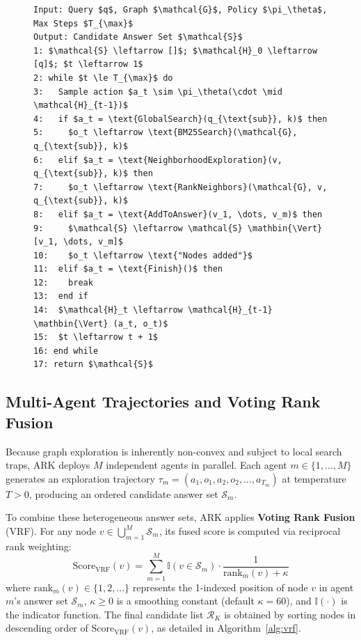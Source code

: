 \documentclass[11pt]{article}
\begin{document}
\begin{figure}[t]
\centering
\begin{lstlisting}[mathescape=true, caption={ARK Single-Agent Trajectory Rollout}, label={alg:ark_rollout}]
Input: Query $q$, Graph $\mathcal{G}$, Policy $\pi_\theta$, Max Steps $T_{\max}$
Output: Candidate Answer Set $\mathcal{S}$
1: $\mathcal{S} \leftarrow []$; $\mathcal{H}_0 \leftarrow [q]$; $t \leftarrow 1$
2: while $t \le T_{\max}$ do
3:   Sample action $a_t \sim \pi_\theta(\cdot \mid \mathcal{H}_{t-1})$
4:   if $a_t = \text{GlobalSearch}(q_{\text{sub}}, k)$ then
5:     $o_t \leftarrow \text{BM25Search}(\mathcal{G}, q_{\text{sub}}, k)$
6:   elif $a_t = \text{NeighborhoodExploration}(v, q_{\text{sub}}, k)$ then
7:     $o_t \leftarrow \text{RankNeighbors}(\mathcal{G}, v, q_{\text{sub}}, k)$
8:   elif $a_t = \text{AddToAnswer}(v_1, \dots, v_m)$ then
9:     $\mathcal{S} \leftarrow \mathcal{S} \mathbin{\Vert} [v_1, \dots, v_m]$
10:    $o_t \leftarrow \text{"Nodes added"}$
11:  elif $a_t = \text{Finish}()$ then
12:    break
13:  end if
14:  $\mathcal{H}_t \leftarrow \mathcal{H}_{t-1} \mathbin{\Vert} (a_t, o_t)$
15:  $t \leftarrow t + 1$
16: end while
17: return $\mathcal{S}$
\end{lstlisting}
\end{figure}

\subsection{Multi-Agent Trajectories and Voting Rank Fusion}
Because graph exploration is inherently non-convex and subject to local search traps, ARK deploys $M$ independent agents in parallel. Each agent $m \in \{1, \dots, M\}$ generates an exploration trajectory $\tau_m = (a_1, o_1, a_2, o_2, \dots, a_{T_m})$ at temperature $T > 0$, producing an ordered candidate answer set $\mathcal{S}_m$.

To combine these heterogeneous answer sets, ARK applies \textbf{Voting Rank Fusion} (VRF). For any node $v \in \bigcup_{m=1}^M \mathcal{S}_m$, its fused score is computed via reciprocal rank weighting:
\begin{equation}
\label{eq:vrf}
\text{Score}_{\text{VRF}}(v) = \sum_{m=1}^M \mathbb{I}(v \in \mathcal{S}_m) \cdot \frac{1}{\text{rank}_m(v) + \kappa}
\end{equation}
where $\text{rank}_m(v) \in \{1, 2, \dots\}$ represents the 1-indexed position of node $v$ in agent $m$'s answer set $\mathcal{S}_m$, $\kappa \ge 0$ is a smoothing constant (default $\kappa = 60$), and $\mathbb{I}(\cdot)$ is the indicator function. The final candidate list $\mathcal{R}_K$ is obtained by sorting nodes in descending order of $\text{Score}_{\text{VRF}}(v)$, as detailed in Algorithm~\ref{alg:vrf}.
\end{document}
